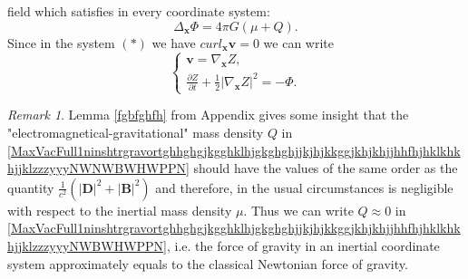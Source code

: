 \documentclass{article}
\theoremstyle{definition}
\theoremstyle{remark}
\newtheorem{remark}{Remark}[section]
\renewcommand{\vec}[1]{\mathbf{#1}}
\newcommand{\er}{\eqref}
\newcommand{\er}{\eqref}
\newtheorem{remark}{Remark}
\begin{document}
field which satisfies in every coordinate system:
\begin{equation}
\label{MaxVacFull1ninshtrgravortghhghgjkgghklhjgkghghjjkjhjkkggjkhjkhjjhhfhjhklkhkhjjklzzzyyyhjggjhgghhjhNWNWNWBWHWPPN}
\Delta_{\vec x}\Phi=4\pi G(\mu+Q).
\end{equation}
Since in the system $(*)$ we have $curl_{\vec x}\vec v=0$ we can
write
\begin{equation}
\label{MaxVacFull1ninshtrgravortghhghgjkgghklhjgkghghjjkjhjkkggjkhjkhjjhhfhjhklkhkhjjklzzzyyyhjggjhgghhjhNWNWNWNWNWBWHWPPN}
\begin{cases}
\vec v=\nabla_{\vec x}Z,\\
\frac{\partial Z}{\partial t}+\frac{1}{2}\left|\nabla_{\vec
x}Z\right|^2=-\Phi.
\end{cases}
\end{equation}
\begin{remark}\label{ghghvghhggghKKK}
Lemma \ref{fgbfghfh} from Appendix gives some insight that the
"electromagnetical-gravitational" mass density $Q$ in
\er{MaxVacFull1ninshtrgravortghhghgjkgghklhjgkghghjjkjhjkkggjkhjkhjjhhfhjhklkhkhjjklzzzyyyNWNWBWHWPPN}
should have the values of the same order as the quantity
$\frac{1}{c^2}\left(|\vec D|^2+|\vec B|^2\right)$ and therefore, in
the usual circumstances is negligible with respect to the inertial
mass density $\mu$. Thus we can write $Q\approx 0$ in
\er{MaxVacFull1ninshtrgravortghhghgjkgghklhjgkghghjjkjhjkkggjkhjkhjjhhfhjhklkhkhjjklzzzyyyNWBWHWPPN},
i.e. the force of gravity in an inertial coordinate system
approximately equals to the classical Newtonian force of gravity.
\end{remark}
\end{document}

